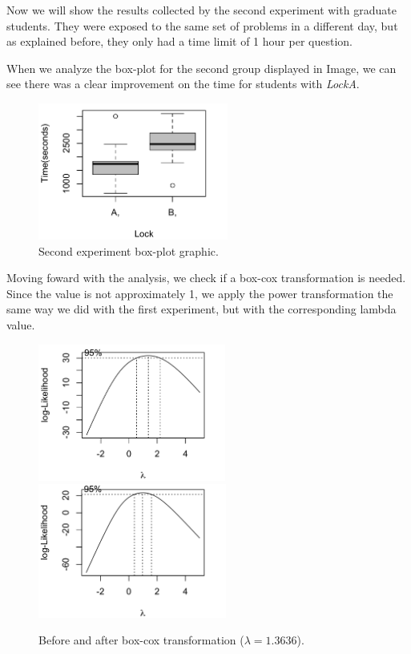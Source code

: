 Now we will show the results collected by the second experiment with graduate students. They were exposed to the same set of problems in a different day, but as explained before, they only had a time limit of 1 hour per question.

When we analyze the box-plot for the second group displayed in Image, we can see there was a clear improvement on the time for students with \emph{LockA}.

\begin{figure}
\centering
\includegraphics[height=4.5cm]{img/g1.png}
\caption{Second experiment box-plot graphic.}
\end{figure}

Moving foward with the analysis, we check if a box-cox transformation is needed. Since the value is not approximately 1, we apply the power transformation the same way we did with the first experiment, but with the corresponding lambda value.

\begin{figure}
\includegraphics[height=4.5cm]{img/g2.png}
\hfill
\includegraphics[height=4.4cm]{img/g2boxcox.png}
\caption{Before and after box-cox transformation ($\lambda = 1.3636$).}
\end{figure}

